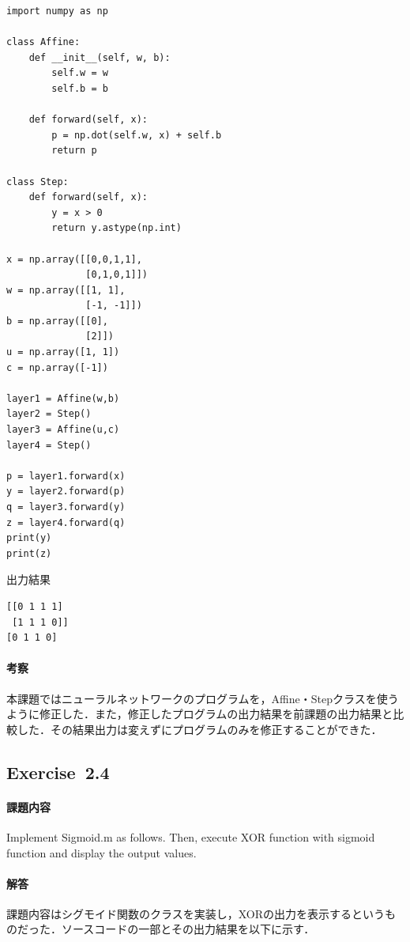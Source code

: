 \documentclass[11pt, a4paper]{jsarticle}
\begin{document}
  \begin{lstlisting}[caption=Exercise~2.3, label=src:exercise2.3]
import numpy as np

class Affine:
    def __init__(self, w, b):
        self.w = w
        self.b = b

    def forward(self, x):
        p = np.dot(self.w, x) + self.b
        return p

class Step:
    def forward(self, x):
        y = x > 0
        return y.astype(np.int)

x = np.array([[0,0,1,1],
              [0,1,0,1]])
w = np.array([[1, 1],
              [-1, -1]])
b = np.array([[0],
              [2]])
u = np.array([1, 1])
c = np.array([-1])

layer1 = Affine(w,b)
layer2 = Step()
layer3 = Affine(u,c)
layer4 = Step()

p = layer1.forward(x)
y = layer2.forward(p)
q = layer3.forward(y)
z = layer4.forward(q)
print(y)
print(z)
  \end{lstlisting}

  \begin{itembox}[l]{出力結果}
    \begin{verbatim}
[[0 1 1 1]
 [1 1 1 0]]
[0 1 1 0]
    \end{verbatim}
  \end{itembox}

  \paragraph{ 考察}
  本課題ではニューラルネットワークのプログラムを，Affine・Stepクラスを使うように修正した．また，修正したプログラムの出力結果を前課題の出力結果と比較した．その結果出力は変えずにプログラムのみを修正することができた．

  \subsection{Exercise~2.4}
  \paragraph{ 課題内容}
  Implement Sigmoid.m as follows.
  Then, execute XOR function with sigmoid function and display the output values.

  \paragraph{ 解答}
  課題内容はシグモイド関数のクラスを実装し，XORの出力を表示するというものだった．ソースコードの一部とその出力結果を以下に示す．
\end{document}

